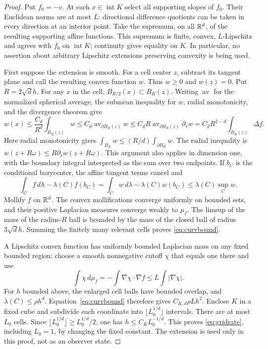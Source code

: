 \begin{proof}
Put $f_0=-v$. At each $x\in\operatorname{int}K$ select all supporting slopes of $f_0$. Their Euclidean norms are at most $L$: directional difference quotients can be taken in every direction at an interior point. Take the supremum, on all $\mathbb R^d$, of the resulting supporting affine functions. This supremum is finite, convex, $L$-Lipschitz and agrees with $f_0$ on $\operatorname{int}K$; continuity gives equality on $K$. In particular, no assertion about arbitrary Lipschitz extensions preserving convexity is being used.

First suppose the extension is smooth. For a cell center $z$, subtract its tangent plane and call the resulting convex function $w$. Thus $w\ge0$ and $w(z)=0$. Put $R=2\sqrt d h$. For any $x$ in the cell, $B_{R/2}(x)\subset B_R(z)$. Writing $\operatorname{av}$ for the normalized spherical average, the submean inequality for $w$, radial monotonicity, and the divergence theorem give
\[
 w(x)\le \frac{C_d}{R^d}\int_{B_R(z)}w
 \le C_d\operatorname{av}_{\partial B_R(z)}w
 \le C_d R\operatorname{av}_{\partial B_R(z)}\partial_r w
 =C_dR^{2-d}\int_{B_R(z)}\Delta f.
\]
Here radial monotonicity gives $\int_{B_R}w\le (R/d)\int_{\partial B_R}w$.
The radial inequality is $w(z+R\omega)\le R\partial_r w(z+R\omega)$. This argument also applies in dimension one, with the boundary integral interpreted as the sum over two endpoints. If $b_C$ is the conditional barycenter, the affine tangent terms cancel and
\[
 \int_Cf\,d\lambda-\lambda(C)f(b_C)
 =\int_Cw\,d\lambda-\lambda(C)w(b_C)
 \le\lambda(C)\sup_Cw.
\]
Mollify $f$ on $\mathbb R^d$. The convex mollifications converge uniformly on bounded sets, and their positive Laplacian measures converge weakly to $\mu_f$. The limsup of the mass of the radius-$R$ ball is bounded by the mass of the closed ball of radius $3\sqrt d h$. Summing the finitely many relevant cells proves \eqref{eq:curvbound}.

A Lipschitz convex function has uniformly bounded Laplacian mass on any fixed bounded region: choose a smooth nonnegative cutoff $\chi$ that equals one there and use
\[
 \int\chi\,d\mu_f=-\int\nabla\chi\cdot\nabla f
 \le L\int|\nabla\chi|.
\]
For $h$ bounded above, the enlarged cell balls have bounded overlap, and $\lambda(C)\le\rho h^d$. Equation~\eqref{eq:curvbound} therefore gives $C_{K,d}\rho Lh^2$. Enclose $K$ in a fixed cube and subdivide each coordinate into $\lfloor L_0^{1/d}\rfloor$ intervals. There are at most $L_0$ cells. Since $\lfloor L_0^{1/d}\rfloor\ge L_0^{1/d}/2$, one has $h\le C_K L_0^{-1/d}$. This proves \eqref{eq:gridrate}, including $L_0=1$, by changing the fixed constant. The extension is used only in this proof, not as an observer state.
\end{proof}

